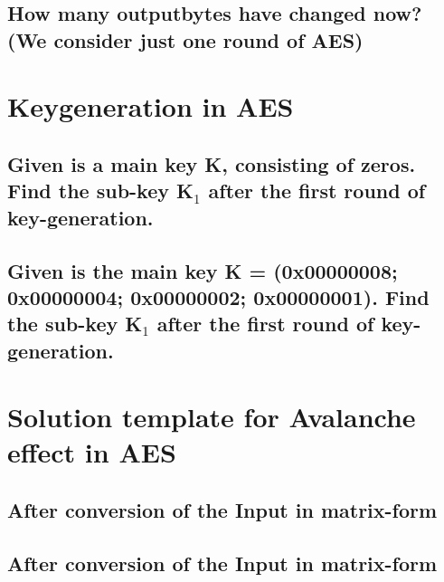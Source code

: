 \subsection{How many outputbytes have changed now? (We consider just one round of AES)}
\label{section:4c}

\section{Keygeneration in AES}

\subsection{Given is a main key K, consisting of zeros. Find the sub-key K$_{1}$ after the first round of key-generation.}
\label{section:5a}

\subsection{Given is the main key K = (0x00000008; 0x00000004; 0x00000002; 0x00000001). Find the sub-key K$_{1}$ after the first round of key-generation.}
\label{section:5b}

\section{Solution template for Avalanche effect in AES}

\subsection{After conversion of the Input in matrix-form}
\label{section:6a}

\subsection{After conversion of the Input in matrix-form}
\label{section:6b}
